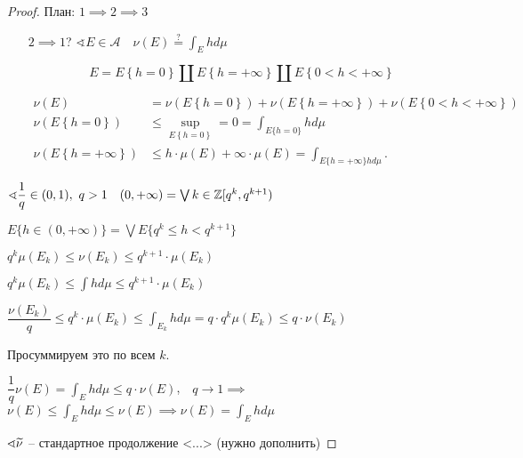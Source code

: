 \begin{proof}
    План: $1 \implies 2\implies 3$

    \begin{itemize}
        \item [$2\implies 1$?] $\sphericalangle E\in \mathscr{A} \quad \nu(E) \overset ? = \int_E hd\mu$

        \[E = E\left\{ h = 0 \right\} \coprod E\left\{ h = +\infty \right\} \coprod E \left\{ 0<h<+\infty  \right\} \]

        \begin{align*}
            \nu(E) &= \nu(E\left\{ h = 0 \right\}) + \nu(E\left\{ h = + \infty  \right\} ) + \nu(E\left\{ 0<h<+\infty  \right\} )\\
            \nu(E\left\{ h = 0 \right\}) &\leqslant  \sup_{E\left\{ h = 0 \right\} } = 0 = \int_{E\{h = 0\}} hd\mu\\
            \nu(E\left\{ h = + \infty  \right\} ) &\leqslant h\cdot \mu(E) + \infty \cdot \mu(E) = \int_{E\{h = +\infty \}hd\mu} 
        .\end{align*}
    \end{itemize}

    $\sphericalangle \dfrac{1}{q} \in (0, 1), ~ q >1~~~ (0, +\infty) = \bigvee\limits{k\in \ensuremath{\mathbb{Z}}} [q^k, q ^{k+1})$

    $E\{ h \in (0, +\infty)\} = \bigvee E \{ q^k \leqslant h < q^{k+1} \}$

    $q^k \mu(E_k) \leqslant \nu(E_k)\leqslant q^{k+1} \cdot \mu(E_k)$

    $q^k \mu(E_k) \leqslant \int h d\mu \leqslant q^{k+1} \cdot \mu(E_k)$

    $\dfrac{\nu(E_k)}{q} \leqslant q^k \cdot \mu(E_k) \leqslant \int_{E_k} h d\mu = 
    q \cdot q^{k} \mu(E_k) \leqslant q \cdot \nu(E_k)$

    Просуммируем это по всем $k$.
    
    $\dfrac{1}{q} \nu(E) = \int_E h d\mu \leqslant q \cdot \nu(E)$,~~$q \to 1 \implies$
    $\nu(E) \leqslant \int_E h d\mu \leqslant\nu(E) \implies \nu(E) = \int_E hd\mu$
    
    $\sphericalangle \widetilde{\nu}$ -- стандартное продолжение <...> (нужно дополнить)
\end{proof}

